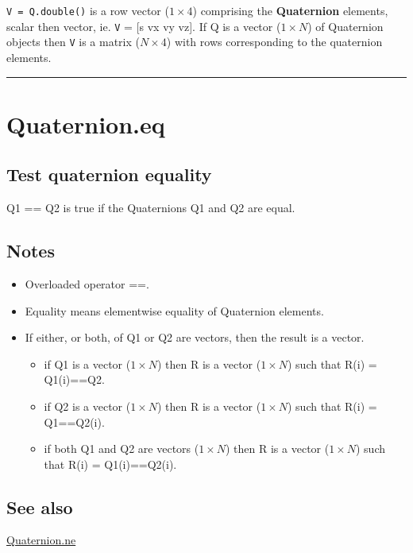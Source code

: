 \texttt{V = Q.double()} is a row vector ($1 \times 4$) comprising the \textbf{\color{red} Quaternion} elements,
scalar then vector, ie. \texttt{V} = [s vx vy vz].  If Q is a vector ($1 \times N$) of
Quaternion objects then \texttt{V} is a matrix ($N \times 4$) with rows corresponding to
the quaternion elements.

\vspace{1.5ex}\hrule

\hypertarget{Quaternion.eq}{\section*{Quaternion.eq}}
\subsection*{Test quaternion equality}


Q1 == Q2 is true if the Quaternions Q1 and Q2 are equal.


\subsection*{Notes}
\begin{itemize}
  \item Overloaded operator \textquotesingle ==\textquotesingle .
  \item Equality means elementwise equality of Quaternion elements.
  \item If either, or both, of Q1 or Q2 are vectors, then the result is a vector.
\begin{itemize}
  \item if Q1 is a vector ($1 \times N$) then R is a vector ($1 \times N$) such that R(i) = Q1(i)==Q2.
  \item if Q2 is a vector ($1 \times N$) then R is a vector ($1 \times N$) such that R(i) = Q1==Q2(i).
  \item if both Q1 and Q2 are vectors ($1 \times N$) then R is a vector ($1 \times N$) such      that R(i) = Q1(i)==Q2(i).
\end{itemize}
\end{itemize}

\subsection*{See also}


\hyperlink{Quaternion.ne}{\color{blue} Quaternion.ne}

